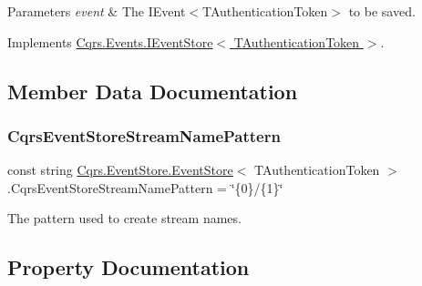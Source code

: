 \begin{DoxyParams}{Parameters}
{\em event} & The I\+Event$<$\+T\+Authentication\+Token$>$ to be saved.\\
\hline
\end{DoxyParams}


Implements \hyperlink{interfaceCqrs_1_1Events_1_1IEventStore_a92e768243d6602d09b786bbd06811ce6_a92e768243d6602d09b786bbd06811ce6}{Cqrs.\+Events.\+I\+Event\+Store$<$ T\+Authentication\+Token $>$}.



\subsection{Member Data Documentation}
\mbox{\label{classCqrs_1_1EventStore_1_1EventStore_ae9733f8511daf86ae3dac78bcbc5b2f0_ae9733f8511daf86ae3dac78bcbc5b2f0}} 
\subsubsection{\texorpdfstring{Cqrs\+Event\+Store\+Stream\+Name\+Pattern}{CqrsEventStoreStreamNamePattern}}
{\footnotesize\ttfamily const string \hyperlink{classCqrs_1_1EventStore_1_1EventStore}{Cqrs.\+Event\+Store.\+Event\+Store}$<$ T\+Authentication\+Token $>$.Cqrs\+Event\+Store\+Stream\+Name\+Pattern = \char`\"{}\{0\}/\{1\}\char`\"{}\hspace{0.3cm}{\ttfamily [protected]}}



The pattern used to create stream names. 



\subsection{Property Documentation}
\mbox{\label{classCqrs_1_1EventStore_1_1EventStore_ae1bc9d364582e951ccdc0f91908b94a2_ae1bc9d364582e951ccdc0f91908b94a2}} 
